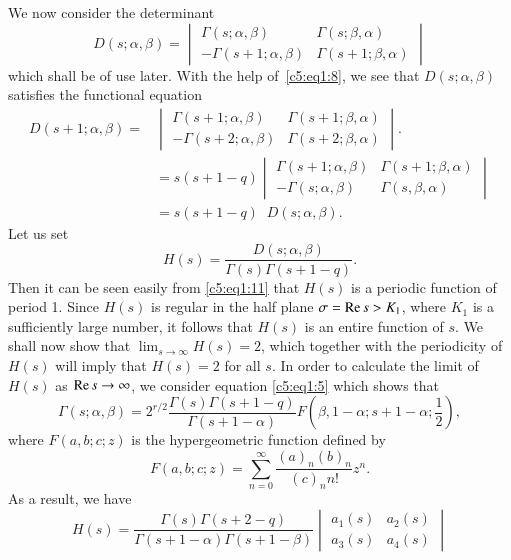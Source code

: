 We now consider the determinant
\begin{equation*}
D(s;\alpha,\beta) = 
\begin{vmatrix}
\Gamma(s;\alpha,\beta) & \Gamma(s;\beta,\alpha)\\
-\Gamma(s+1;\alpha,\beta) & \Gamma(s+1;\beta,\alpha)
\end{vmatrix}\tag{10}\label{c5:eq1:10}
\end{equation*}
which shall be of use later. With the help of~\eqref{c5:eq1:8}, we see that
$D(s;\alpha,\beta)$ satisfies the functional equation
\begin{align*}
D(s+1;\alpha,\beta) = & 
\begin{vmatrix}
\Gamma(s+1;\alpha,\beta) & \Gamma(s+1;\beta,\alpha)\\
-\Gamma(s+2;\alpha,\beta) & \Gamma(s+2;\beta, \alpha)
\end{vmatrix}.\\
& = s (s+1-q) \begin{vmatrix}
\Gamma(s+1;\alpha,\beta) & \Gamma(s+1;\beta,\alpha)\\
-\Gamma(s;\alpha,\beta) & \Gamma(s,\beta,\alpha)
\end{vmatrix}\\
& = s (s+1-q) \;\; D (s; \alpha, \beta).\tag{11}\label{c5:eq1:11}
\end{align*}
Let us set 
$$
H(s) =\frac{D(s;\alpha,\beta)}{\Gamma(s)\Gamma(s+1-q)}. 
$$
Then it can be seen easily from \eqref{c5:eq1:11} that $H(s)$ is a periodic
function of period 1. Since $H(s)$ is regular in the half plane
$\sigma=\operatorname{Re} s> K_1$, where $K_1$ is a sufficiently large number, it
follows that $H(s)$ is an entire function of $s$. We shall now show
that $\lim_{s\to \infty}H(s)=2$, which together with the periodicity
of $H(s)$ will imply that $H(s) = 2$ for all $s$. In order to
calculate the limit of $H(s)$ as $\operatorname{Re} s\to \infty$, we consider
equation \eqref{c5:eq1:5} which shows that
\begin{equation*}
\Gamma(s;\alpha,\beta) = 2^{r/2}
\frac{\Gamma(s)\Gamma(s+1-q)}{\Gamma(s+1-\alpha)} F(\beta,1-\alpha;
s+1-\alpha;\frac{1}{2}),\tag{12}\label{c5:eq1:12} 
\end{equation*}
where \pageoriginale $F(a,b;c;z)$ is the hypergeometric function
defined by
$$
F(a,b;c;z) = \sum^{\infty}_{n=0} \frac{(a)_n(b)_n}{(c)_n n!} z^n.
$$
As a result, we have
$$
H(s) =
\frac{\Gamma(s)\Gamma(s+2-q)}{\Gamma(s+1-\alpha)
\Gamma(s+1-\beta)} \begin{vmatrix}
a_1(s) & a_2(s)\\
a_3(s) & a_4(s)
\end{vmatrix}
$$
